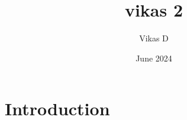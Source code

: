\documentclass{article}
\title{vikas 2}
\author{Vikas D}
\date{June 2024}
\begin{document}
\maketitle

\section{Introduction}
\end{document}
